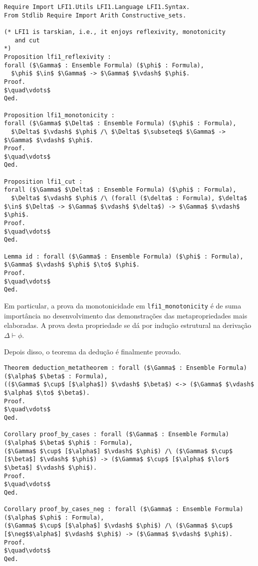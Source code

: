           \begin{lstlisting}[name=Deduction, frame=single, language=coq]
Require Import LFI1.Utils LFI1.Language LFI1.Syntax.
From Stdlib Require Import Arith Constructive_sets.

(* LFI1 is tarskian, i.e., it enjoys reflexivity, monotonicity
   and cut
*)
Proposition lfi1_reflexivity : 
forall ($\Gamma$ : Ensemble Formula) ($\phi$ : Formula),
  $\phi$ $\in$ $\Gamma$ -> $\Gamma$ $\vdash$ $\phi$.
Proof.
$\quad\vdots$
Qed.

Proposition lfi1_monotonicity :
forall ($\Gamma$ $\Delta$ : Ensemble Formula) ($\phi$ : Formula),
  $\Delta$ $\vdash$ $\phi$ /\ $\Delta$ $\subseteq$ $\Gamma$ -> $\Gamma$ $\vdash$ $\phi$.
Proof.
$\quad\vdots$
Qed.

Proposition lfi1_cut :
forall ($\Gamma$ $\Delta$ : Ensemble Formula) ($\phi$ : Formula),
  $\Delta$ $\vdash$ $\phi$ /\ (forall ($\delta$ : Formula), $\delta$ $\in$ $\Delta$ -> $\Gamma$ $\vdash$ $\delta$) -> $\Gamma$ $\vdash$ $\phi$.
Proof.
$\quad\vdots$
Qed.

Lemma id : forall ($\Gamma$ : Ensemble Formula) ($\phi$ : Formula), $\Gamma$ $\vdash$ $\phi$ $\to$ $\phi$.
Proof.
$\quad\vdots$
Qed.

          \end{lstlisting}

          Em particular, a prova da monotonicidade em \texttt{lfi1\_monotonicity} é de suma importância no desenvolvimento das demonstrações das metapropriedades mais elaboradas. A prova desta propriedade se dá por indução estrutural na derivação $\Delta \vdash \phi$.

          Depois disso, o teorema da dedução é finalmente provado.

          \begin{lstlisting}[name=Deduction, frame=single, language=coq]
Theorem deduction_metatheorem : forall ($\Gamma$ : Ensemble Formula) ($\alpha$ $\beta$ : Formula), 
(($\Gamma$ $\cup$ [$\alpha$]) $\vdash$ $\beta$) <-> ($\Gamma$ $\vdash$ $\alpha$ $\to$ $\beta$).
Proof. 
$\quad\vdots$
Qed.

Corollary proof_by_cases : forall ($\Gamma$ : Ensemble Formula) ($\alpha$ $\beta$ $\phi$ : Formula), 
($\Gamma$ $\cup$ [$\alpha$] $\vdash$ $\phi$) /\ ($\Gamma$ $\cup$ [$\beta$] $\vdash$ $\phi$) -> ($\Gamma$ $\cup$ [$\alpha$ $\lor$ $\beta$] $\vdash$ $\phi$).
Proof.
$\quad\vdots$
Qed.
  
Corollary proof_by_cases_neg : forall ($\Gamma$ : Ensemble Formula) ($\alpha$ $\phi$ : Formula), 
($\Gamma$ $\cup$ [$\alpha$] $\vdash$ $\phi$) /\ ($\Gamma$ $\cup$ [$\neg$$\alpha$] $\vdash$ $\phi$) -> ($\Gamma$ $\vdash$ $\phi$).
Proof.
$\quad\vdots$
Qed.
          \end{lstlisting}

